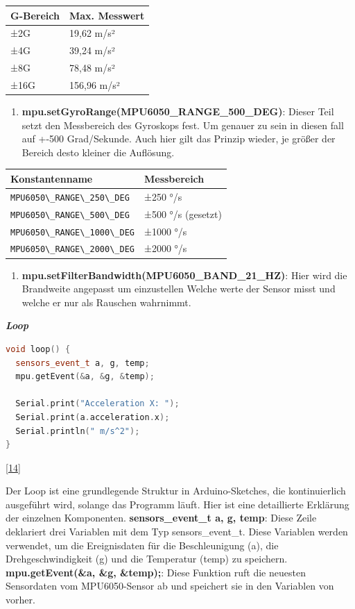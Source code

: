 \documentclass[
    headings=optiontotocandhead,%
    twoside,
    numbers=noenddot,%
    12pt, %
    titlepage, %
    parskip=full, %
    listof=leveldown, 
    numbers=noenddot, %
    a4paper,DIV=14,
    BCOR=15mm,
]{scrbook}
\newcommand{\passthrough}[1]{#1}
\providecommand{\tightlist}{%
  \setlength{\itemsep}{0pt}\setlength{\parskip}{0pt}}
\begin{document}
\begin{longtable}[]{@{}ll@{}}
\toprule
G-Bereich & Max. Messwert\tabularnewline
\midrule
\endhead
±2G & 19,62 m/s²\tabularnewline
±4G & 39,24 m/s²\tabularnewline
±8G & 78,48 m/s²\tabularnewline
±16G & 156,96 m/s²\tabularnewline
\bottomrule
\end{longtable}

\begin{enumerate}
\def\labelenumi{\arabic{enumi}.}
\setcounter{enumi}{3}
\tightlist
\item
  \textbf{mpu.setGyroRange(MPU6050\_RANGE\_500\_DEG)}: Dieser Teil setzt
  den Messbereich des Gyroskops fest. Um genauer zu sein in diesen fall
  auf +-500 Grad/Sekunde. Auch hier gilt das Prinzip wieder, je größer
  der Bereich desto kleiner die Auflösung.
\end{enumerate}

\begin{longtable}[]{@{}ll@{}}
\toprule
Konstantenname & Messbereich\tabularnewline
\midrule
\endhead
\passthrough{\lstinline!MPU6050\_RANGE\_250\_DEG!} & ±250
°/s\tabularnewline
\passthrough{\lstinline!MPU6050\_RANGE\_500\_DEG!} & ±500 °/s
(gesetzt)\tabularnewline
\passthrough{\lstinline!MPU6050\_RANGE\_1000\_DEG!} & ±1000
°/s\tabularnewline
\passthrough{\lstinline!MPU6050\_RANGE\_2000\_DEG!} & ±2000
°/s\tabularnewline
\bottomrule
\end{longtable}

\begin{enumerate}
\def\labelenumi{\arabic{enumi}.}
\setcounter{enumi}{4}
\tightlist
\item
  \textbf{mpu.setFilterBandwidth(MPU6050\_BAND\_21\_HZ)}: Hier wird die
  Brandweite angepasst um einzustellen Welche werte der Sensor misst und
  welche er nur als Rauschen wahrnimmt.
\end{enumerate}

\textbf{\emph{Loop}}

\begin{lstlisting}[language={C++}, caption={Loop Funktion des MPU Sensors}]
void loop() { 
  sensors_event_t a, g, temp;
  mpu.getEvent(&a, &g, &temp);

  Serial.print("Acceleration X: ");
  Serial.print(a.acceleration.x);
  Serial.println(" m/s^2");
}
\end{lstlisting}

{[}\protect\hyperlink{ref-MPU6050-Test}{14}{]}

Der Loop ist eine grundlegende Struktur in Arduino-Sketches, die
kontinuierlich ausgeführt wird, solange das Programm läuft. Hier ist
eine detaillierte Erklärung der einzelnen Komponenten.
\textbf{sensors\_event\_t a, g, temp}: Diese Zeile deklariert drei
Variablen mit dem Typ sensors\_event\_t. Diese Variablen werden
verwendet, um die Ereignisdaten für die Beschleunigung (a), die
Drehgeschwindigkeit (g) und die Temperatur (temp) zu speichern.
\textbf{mpu.getEvent(\&a, \&g, \&temp);}: Diese Funktion ruft die
neuesten Sensordaten vom MPU6050-Sensor ab und speichert sie in den
Variablen von vorher.
\end{document}
